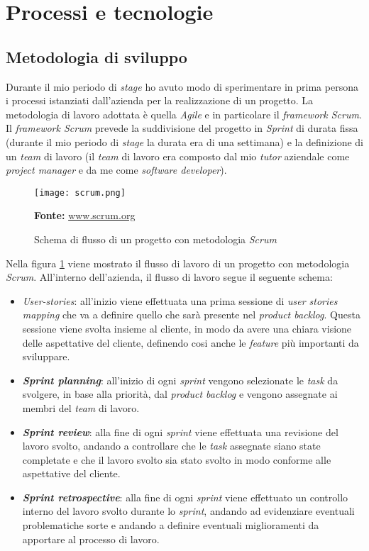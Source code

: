 \section{Processi e tecnologie}
\subsection{Metodologia di sviluppo}
Durante il mio periodo di \textit{stage} ho avuto modo di sperimentare in prima persona i processi istanziati dall'azienda per la realizzazione di un progetto.
La metodologia di lavoro adottata è quella \textit{Agile} e in particolare il \textit{framework Scrum}.\\ 
Il \textit{framework Scrum} prevede la suddivisione del progetto in \textit{Sprint} di durata fissa (durante il mio periodo di \textit{stage} la durata era di una settimana) e la definizione di un \textit{team} di lavoro (il \textit{team} di lavoro era composto dal mio \textit{tutor} aziendale come \textit{project manager} e da me come \textit{software developer}).
\begin{figure}[H]
    \centering
    \texttt{[image: scrum.png]}
    \caption{Schema di flusso di un progetto con metodologia \textit{Scrum}}
    \small \textbf{Fonte:} \url{www.scrum.org}
    \label{fig:scrum}
\end{figure}
Nella figura \ref{fig:scrum} viene mostrato il flusso di lavoro di un progetto con metodologia \textit{Scrum}. All'interno dell'azienda, il flusso di lavoro segue il seguente schema:
\begin{itemize}
    \item \textit{\gls{User-stories}}: all'inizio viene effettuata una prima sessione di \textit{user stories mapping} che va a definire quello che sarà presente nel \textit{product backlog}. Questa sessione viene svolta insieme al cliente, in modo da avere una chiara visione delle aspettative del cliente, definendo cosi anche le \textit{feature} più importanti da sviluppare.
    \item \textbf{\textit{Sprint planning}}: all'inizio di ogni \textit{sprint} vengono selezionate le \textit{task} da svolgere, in base alla priorità, dal \textit{product backlog} e vengono assegnate ai membri del \textit{team} di lavoro.
    \item \textbf{\textit{Sprint review}}: alla fine di ogni \textit{sprint} viene effettuata una revisione del lavoro svolto, andando a controllare che le \textit{task} assegnate siano state completate e che il lavoro svolto sia stato svolto in modo conforme alle aspettative del cliente.
    \item \textbf{\textit{Sprint retrospective}}: alla fine di ogni \textit{sprint} viene effettuato un controllo interno del lavoro svolto durante lo \textit{sprint}, andando ad evidenziare eventuali problematiche sorte e andando a definire eventuali miglioramenti da apportare al processo di lavoro.
\end{itemize}
